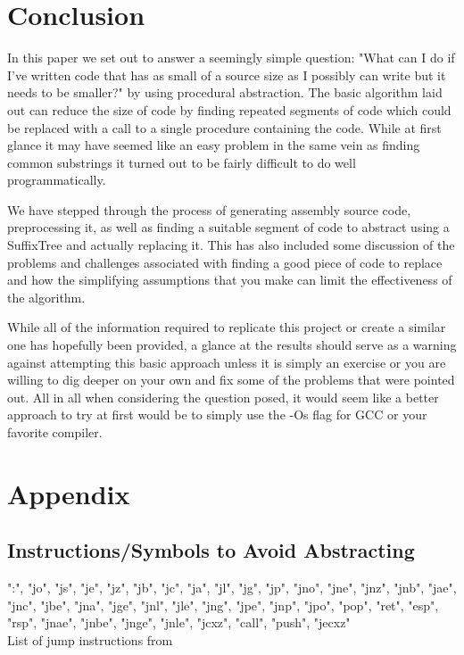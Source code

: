 \documentclass[9pt,nocopyrightspace]{sigplanconf}
\begin{document}
\section{Conclusion}

In this paper we set out to answer a seemingly simple question: "What can I do if I've written code that has as small of a source size as I possibly can write but it needs to be smaller?" by using procedural abstraction.
The basic algorithm laid out can reduce the size of code by finding repeated segments of code which could be replaced with a call to a single procedure containing the code.
While at first glance it may have seemed like an easy problem in the same vein as finding common substrings it turned out to be fairly difficult to do well programmatically.

We have stepped through the process of generating assembly source code, preprocessing it, as well as finding a suitable segment of code to abstract using a SuffixTree and actually replacing it.
This has also included some discussion of the problems and challenges associated with finding a good piece of code to replace and how the simplifying assumptions that you make can limit the effectiveness of the algorithm.

While all of the information required to replicate this project or create a similar one has hopefully been provided, a glance at the results should serve as a warning against attempting this basic approach unless it is simply an exercise or you are willing to dig deeper on your own and fix some of the problems that were pointed out.
All in all when considering the question posed, it would seem like a better approach to try at first would be to simply use the -Os flag for GCC or your favorite compiler.

\appendix
\section{Appendix}

\subsection{Instructions/Symbols to Avoid Abstracting}
":", "jo", "js", "je", "jz", "jb", "jc", "ja", "jl", "jg", "jp", "jno", "jne", "jnz", "jnb", "jae", "jnc", "jbe", "jna", "jge", "jnl", "jle", "jng", "jpe", "jnp", "jpo", "pop", "ret", "esp", "rsp", "jnae", "jnbe", "jnge", "jnle", "jcxz", "call", "push", "jecxz"
\\ List of jump instructions from \cite{intel01}
\end{document}
